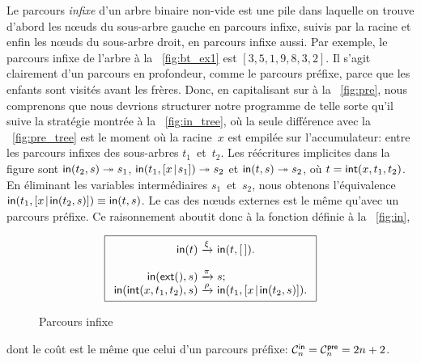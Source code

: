 Le parcours \emph{infixe} d'un arbre binaire non-vide est une pile
dans laquelle on trouve d'abord les n{\oe}uds du sous-arbre gauche en
parcours infixe, suivis par la racine et enfin les n{\oe}uds du
sous-arbre droit, en parcours infixe aussi. Par exemple, le parcours
infixe de l'arbre à la \fig~\vref{fig:bt_ex1} est
\([3,5,1,9,8,3,2]\). Il s'agit clairement d'un parcours en profondeur,
comme le parcours préfixe, parce que les enfants sont visités avant
les frères. Donc, en capitalisant sur
 à la \fig~\vref{fig:pre}, nous
comprenons que nous devrions structurer notre programme de telle sorte
qu'il suive la stratégie montrée à la \fig~\vref{fig:in_tree}, où la
seule différence avec la \fig~\ref{fig:pre_tree} est le moment où la
racine~\(x\) est empilée sur l'accumulateur: entre les parcours infixes des
sous-arbres \(t_1\)~et~\(t_2\). Les réécritures implicites dans la
figure sont \(\fun{in}(t_2,s) \twoheadrightarrow
s_1\), \(\fun{in}(t_1,\cons{x}{s_1})
\twoheadrightarrow s_2\) et \(\fun{in}(t,s) \twoheadrightarrow s_2\),
où \(t=\fun{int}(x,t_1,t_2)\). En éliminant les variables
intermédiaires \(s_1\)~et~\(s_2\), nous obtenons l'équivalence
\(\fun{in}(t_1,\cons{x}{\fun{in}(t_2,s)}) \equiv \fun{in}(t,s)\). Le
cas des n{\oe}uds externes est le même qu'avec un parcours préfixe. Ce
raisonnement aboutit donc à la fonction définie à la
\fig~\vref{fig:in},
\begin{figure}
\begin{equation*}
\boxed{
\begin{array}{r@{\;}c@{\;}l}
\fun{in}(t) & \xrightarrow{\xi} & \fun{in}(t,\el).\\
\\
\fun{in}(\fun{ext}(),s) & \xrightarrow{\smash{\pi}} & s;\\
\fun{in}(\fun{int}(x,t_1,t_2),s)
  & \xrightarrow{\smash{\rho}}
  & \fun{in}(t_1,\cons{x}{\fun{in}(t_2,s)}).
\end{array}}
\end{equation*}
\caption{Parcours infixe\label{fig:in}}
\end{figure}
dont le coût est le même que celui d'un parcours préfixe:
\(\C{\fun{in}}{n} = \C{\fun{pre}}{n} = 2n +
2\).

